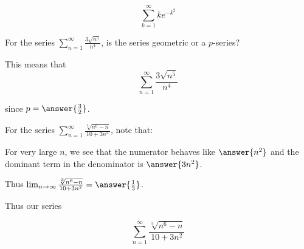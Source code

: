 \documentclass{ximera}
\begin{document}
\begin{exercise}
\begin{hint}
\begin{question}
\[
 \sum_{k=1}^{\infty}ke^{-k^2}
\]

\begin{multipleChoice}
\end{multipleChoice}




\end{question}



\begin{question}
For the series $\sum_{n=1}^{\infty} \frac{3\sqrt{n^5}}{n^4}$, is the series geometric or a $p$-series?

\begin{multipleChoice}
\end{multipleChoice}


This means that 
\[
 \sum_{n=1}^{\infty} \frac{3\sqrt{n^5}}{n^4}
\]

\begin{multipleChoice}
\end{multipleChoice}

since $p=\answer{ \frac{3}{2}}$. 


\end{question}

\begin{question}
For the series $\sum_{n=1}^{\infty}\frac{\sqrt[3]{n^6-n}}{10+3n^2}$, note that:

\begin{multipleChoice}
\end{multipleChoice}

For very large $n$, we see that the numerator behaves like $\answer{n^2}$ and the dominant term in the denominator 
is $\answer{3n^2}$. 

Thus $\lim_{n \to \infty} \frac{\sqrt[3]{n^6-n}}{10+3n^2}=\answer{ \frac{1}{3}}$. 



Thus our series

\[
\sum_{n=1}^{\infty}\frac{\sqrt[3]{n^6-n}}{10+3n^2}
\]


\end{question}
\end{hint}
\end{exercise}
\end{document}
